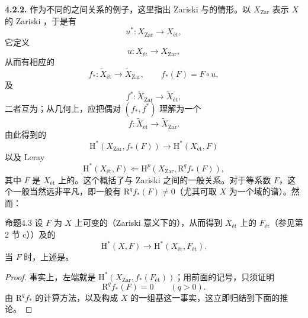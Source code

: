 \textbf{4.2.2.} 作为不同的之间关系的例子，这里指出 Zariski 与的情形。以 $X_{\mathrm{Zar}}$ 表示 $X$ 的 Zariski ，于是有
\[
 u^*:X_{\mathrm{Zar}}\longrightarrow X_{\text{ét}},
\]
它定义
\[
 u:X_{\text{ét}}\longrightarrow X_{\mathrm{Zar}},
\]
从而有相应的
\[
 f_*:\widetilde X_{\text{ét}}\longrightarrow\widetilde X_{\mathrm{Zar}},
 \qquad f_*(F)=F\circ u,
\]
及
\[
 f^*:\widetilde X_{\mathrm{Zar}}\longrightarrow\widetilde X_{\text{ét}},
\]
二者互为；从几何上，应把偶对 $(f_*,f^*)$ 理解为一个
\[
 f:\widetilde X_{\text{ét}}\longrightarrow\widetilde X_{\mathrm{Zar}}.
\]
由此得到的
\[
 \mathrm H^*(X_{\mathrm{Zar}},f_*(F))\longrightarrow\mathrm H^*(X_{\text{ét}},F)
\]
以及 Leray 
\[
 \mathrm H^*(X_{\text{ét}},F)\Longleftarrow
 \mathrm H^p(X_{\mathrm{Zar}},\mathrm R^qf_*(F)),
\]
其中 $F$ 是 $X_{\text{ét}}$ 上的。这个概括了与 Zariski 之间的一般关系。对于等系数 $F$，这个一般当然远非平凡，即一般有 $\mathrm R^qf_*(F)\ne0$（尤其可取 $X$ 为一个域的谱）。然而：

\begin{SGAresult}{命题}{4.3}
设 $F$ 为 $X$ 上可变的（Zariski 意义下的），从而得到 $X_{\text{ét}}$ 上的 $F_{\text{ét}}$（参见第 2 节 c））及的
\[
 \mathrm H^*(X,F)\longrightarrow\mathrm H^*(X_{\text{ét}},F_{\text{ét}}).
\]
当 $F$ 时，上述是。
\end{SGAresult}
\begin{proof}
事实上，左端就是 $\mathrm H^*(X_{\mathrm{Zar}},f_*(F_{\text{ét}}))$；用前面的记号，只须证明
\[
 \mathrm R^qf_*(F)=0\qquad(q>0).
\]
由 $\mathrm R^qf_*$ 的计算方法，以及构成 $X$ 的一组基这一事实，这立即归结到下面的推论。
\end{proof}

